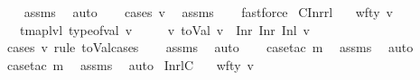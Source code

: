 \begin{isabellebody}
\ \ \isamarkupfalse%
\ assms\ \isamarkupfalse%
\ auto\isanewline
\ \ \isamarkupfalse%
\ {\isacharparenleft}{\kern0pt}cases\ v{\isacharprime}{\kern0pt}{\isacharparenright}{\kern0pt}\ \isamarkupfalse%
\ assms\isanewline
\ \ \isamarkupfalse%
\ fastforce{\isacharplus}{\kern0pt}%
\endisatagproof
{\isafoldproof}%
%
\isadelimproof
\isanewline
%
\endisadelimproof
\isanewline
{}\isamarkupfalse%
\ C{}Inrrl{\isacharcolon}{\kern0pt}\isanewline
\ \ \ {\isachardoublequoteopen}wf{\isacharunderscore}{\kern0pt}ty\ v{\isachardoublequoteclose}\isanewline
\ \ \ {\isachardoublequoteopen}tmap{\isacharunderscore}{\kern0pt}lvl\ {\isacharparenleft}{\kern0pt}type{\isacharunderscore}{\kern0pt}of{\isacharunderscore}{\kern0pt}val\ v{\isacharparenright}{\kern0pt}\ {\isacharequal}{\kern0pt}\ {}{\isachardoublequoteclose}\isanewline
\ \ \ {\isachardoublequoteopen}{\isasymexists}v{\isacharprime}{\kern0pt}{\isachardot}{\kern0pt}\ toVal{}{}{}{}\ v\ {\isacharequal}{\kern0pt}\ Inr\ {\isacharparenleft}{\kern0pt}Inr\ {\isacharparenleft}{\kern0pt}Inl\ v{\isacharprime}{\kern0pt}{\isacharparenright}{\kern0pt}{\isacharparenright}{\kern0pt}{\isachardoublequoteclose}\isanewline
%
\isadelimproof
\ \ %
\endisadelimproof
%
\isatagproof
{}\isamarkupfalse%
\ {\isacharparenleft}{\kern0pt}cases\ v\ rule{\isacharcolon}{\kern0pt}\ toVal{}{}{}{}{\isachardot}{\kern0pt}cases{\isacharparenright}{\kern0pt}\isanewline
\ \ \isamarkupfalse%
\ assms\ \isamarkupfalse%
\ auto\isanewline
\ \ \isamarkupfalse%
\ {\isacharparenleft}{\kern0pt}case{\isacharunderscore}{\kern0pt}tac\ m{\isacharparenright}{\kern0pt}\ \isamarkupfalse%
\ assms\ \isamarkupfalse%
\ auto\isanewline
\ \ \isamarkupfalse%
\ {\isacharparenleft}{\kern0pt}case{\isacharunderscore}{\kern0pt}tac\ m{\isacharparenright}{\kern0pt}\ \isamarkupfalse%
\ assms\ \isamarkupfalse%
\ auto\isanewline
{}\isamarkupfalse%
%
\endisatagproof
{\isafoldproof}%
%
\isadelimproof
\isanewline
%
\endisadelimproof
\isanewline
{}\isamarkupfalse%
\ InrlC{}{\isacharcolon}{\kern0pt}\isanewline
\ \ \ {\isachardoublequoteopen}wf{\isacharunderscore}{\kern0pt}ty\ v{\isachardoublequoteclose}\isanewline

\end{isabellebody}
